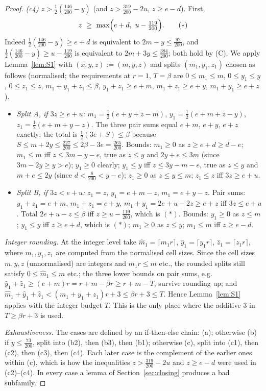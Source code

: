 \documentclass[11pt]{amsart}
\theoremstyle{definition}
\theoremstyle{remark}
\newcommand{\ceil}[1]{\lceil #1\rceil}
\begin{document}
\begin{proof}
\emph{(c4) $z>\tfrac12(\tfrac{146}{200}-y)$} (and $z>\tfrac{319}{200}-2u$, $z\ge e-d$). First,
\[
z\ \ge\ \max\Bigl(e+d,\ u-\tfrac{119}{200}\Bigr). \tag{$*$}
\]
Indeed $\tfrac12(\tfrac{146}{200}-y)\ge e+d$ is equivalent to $2m-y\le\tfrac{92}{200}$, and $\tfrac12(\tfrac{146}{200}-y)\ge u-\tfrac{119}{200}$ is equivalent to $2m+3y\le\tfrac{384}{200}$; both hold by (C). We apply Lemma~\ref{lem:S1} with $(x,y,z):=(m,y,z)$ and splits $(m_1,y_1,z_1)$ chosen as follows (normalised; the requirements at $r=1$, $T=\beta$ are $0\le m_1\le m$, $0\le y_1\le y$, $0\le z_1\le z$, $m_1+y_1+z_1\le\beta$, $y_1+z_1\ge e+m$, $m_1+z_1\ge e+y$, $m_1+y_1\ge e+z$).
\begin{itemize}
\item \emph{Split A, if $3z\ge e+u$:} $m_1=\tfrac12(e+y+z-m)$, $y_1=\tfrac12(e+m+z-y)$, $z_1=\tfrac12(e+m+y-z)$. The three pair sums equal $e+m$, $e+y$, $e+z$ exactly; the total is $\tfrac12(3e+S)\le\beta$ because $S\le m+2y\le\tfrac{227}{200}\le2\beta-3e=\tfrac{265}{200}$. Bounds: $m_1\ge0$ as $z\ge e+d\ge d-e$; $m_1\le m$ iff $z\le3m-y-e$, true as $z\le y$ and $2y+e\le3m$ (since $3m-2y\ge y>e$); $y_1\ge0$ clearly; $y_1\le y$ iff $z\le3y-m-e$, true as $z\le y$ and $m+e\le2y$ (since $d<\tfrac{8}{200}<y-e$); $z_1\ge0$ as $z\le y\le m$; $z_1\le z$ iff $3z\ge e+u$.
\item \emph{Split B, if $3z<e+u$:} $z_1=z$, $y_1=e+m-z$, $m_1=e+y-z$. Pair sums: $y_1+z_1=e+m$, $m_1+z_1=e+y$, $m_1+y_1=2e+u-2z\ge e+z$ iff $3z\le e+u$. Total $2e+u-z\le\beta$ iff $z\ge u-\tfrac{119}{200}$, which is $(*)$. Bounds: $y_1\ge0$ as $z\le m$; $y_1\le y$ iff $z\ge e+d$, which is $(*)$; $m_1\ge0$ as $z\le y$; $m_1\le m$ iff $z\ge e-d$.
\end{itemize}
\emph{Integer rounding.} At the integer level take $\hat m_1=\ceil{m_1r}$, $\hat y_1=\ceil{y_1r}$, $\hat z_1=\ceil{z_1r}$, where $m_1,y_1,z_1$ are computed from the normalised cell sizes. Since the cell sizes $m,y,z$ (unnormalised) are integers and $m_1r\le m$ etc., the rounded splits still satisfy $0\le\hat m_1\le m$ etc.; the three lower bounds on pair sums, e.g.\ $\hat y_1+\hat z_1\ge (e+\bar m)r=r+m-\beta r\ge r+m-T$, survive rounding up; and $\hat m_1+\hat y_1+\hat z_1<(m_1+y_1+z_1)r+3\le\beta r+3\le T$. Hence Lemma~\ref{lem:S1} applies with the integer budget $T$. This is the only place where the additive $3$ in $T\ge\beta r+3$ is used.

\medskip\noindent\emph{Exhaustiveness.} The cases are defined by an if-then-else chain: (a); otherwise (b) if $y\le\tfrac{73}{200}$, split into (b2), then (b3), then (b1); otherwise (c), split into (c1), then (c2), then (c3), then (c4). Each later case is the complement of the earlier ones within (c), which is how the inequalities $z>\tfrac{319}{200}-2u$ and $z\ge e-d$ were used in (c2)--(c4). In every case a lemma of Section~\ref{sec:closing} produces a bad subfamily.
\end{proof}
\end{document}
